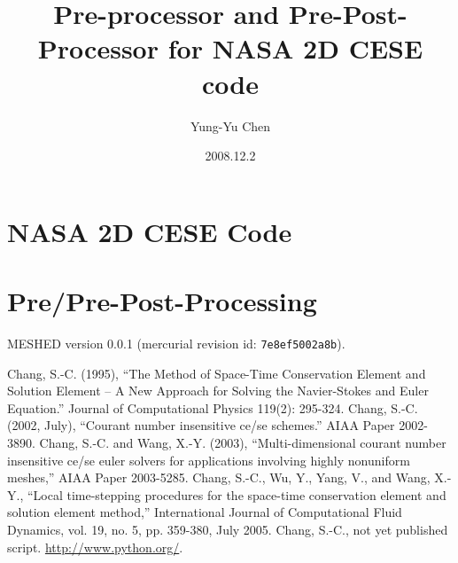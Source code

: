 \documentclass[letterpaper,12pt,dvips]{article}
\numberwithin{equation}{section}
\begin{document}
\title{Pre-processor and Pre-Post-Processor for NASA 2D CESE code}
\author{Yung-Yu Chen}
\date{2008.12.2}

\maketitle

\tableofcontents

\hspace{.5cm}

\section{NASA 2D CESE Code}

\section{Pre/Pre-Post-Processing}

MESHED version 0.0.1 (mercurial revision id: \verb+7e8ef5002a8b+).

\begin{thebibliography}{99}
 Chang, S.-C. (1995), 
``The Method of Space-Time Conservation Element and Solution Element -- 
A New Approach for Solving the Navier-Stokes and Euler Equation.''
Journal of Computational Physics 119(2): 295-324.
 Chang, S.-C. (2002, July),
``Courant number insensitive ce/se schemes.'' AIAA Paper 2002-3890.
 Chang, S.-C. and Wang, X.-Y. (2003), 
``Multi-dimensional courant number insensitive ce/se euler solvers for 
applications involving highly nonuniform meshes,'' 
AIAA Paper 2003-5285.
 Chang, S.-C., Wu, Y., Yang, V., and Wang, X.-Y., 
``Local time-stepping procedures for the space-time conservation element 
and solution element method,'' 
International Journal of Computational Fluid Dynamics, 
vol. 19, no. 5, pp. 359-380, July 2005.
 Chang, S.-C., not yet published script.
 \url{http://www.python.org/}.
\end{thebibliography}
\end{document}
